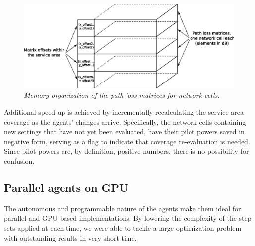 \begin{figure}
\centering

\includegraphics[width=1\textwidth]{06-experimental_evaluation-service_coverage/img/pathloss_matrices}

\caption{\textit{Memory organization of the path-loss matrices for network
cells.\label{fig:path-loss_matrices_memory_organization}}}
\end{figure}


Additional speed-up is achieved by incrementally recalculating the
service area coverage as the agents' changes arrive. Specifically,
the network cells containing new settings that have not yet been evaluated,
have their pilot powers saved in negative form, serving as a flag
to indicate that coverage re-evaluation is needed. Since pilot powers
are, by definition, positive numbers, there is no possibility for
confusion.


\subsection{Parallel agents on GPU}

The autonomous and programmable nature of the agents make them ideal
for parallel and GPU-based implementations. By lowering the complexity
of the step sets applied at each time, we were able to tackle a large
optimization problem with outstanding results in very short time.

